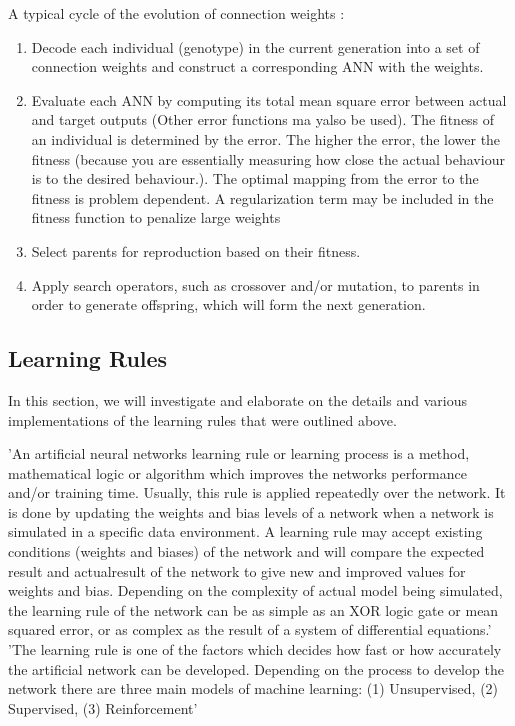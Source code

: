 A typical cycle of the evolution of connection weights \cite{XinYao1999}:
\begin{enumerate}
	\item Decode each individual (genotype) in the current generation into a set of connection weights and construct a corresponding ANN with the weights.
	\item Evaluate each ANN by computing its total mean square error between actual and target outputs (Other error functions ma yalso be used). The fitness of an individual is determined by the error. The higher the error, the lower the fitness (because you are essentially measuring how close the actual behaviour is to the desired behaviour.). The optimal mapping from the error to the fitness is problem dependent. A regularization term may be included in the fitness function to penalize large weights
	\item Select parents for reproduction based on their fitness.
	\item Apply search operators, such as crossover and/or mutation, to parents in order to generate offspring, which will form the next generation.
\end{enumerate}

\subsection{Learning Rules}

In this section, we will investigate and elaborate on the details and various implementations of the learning rules that were outlined above.

'An artificial neural networks learning rule or learning process is a method, mathematical logic or algorithm which improves the networks performance and/or training time. Usually, this rule is applied repeatedly over the network. It is done by updating the weights and bias levels of a network when a network is simulated in a specific data environment. A learning rule may accept existing conditions (weights and biases) of the network and will compare the expected result and actualresult of the network to give new and improved values for weights and bias. Depending on the complexity of actual model being simulated, the learning rule of the network can be as simple as an XOR logic gate or mean squared error, or as complex as the result of a system of differential equations.'
'The learning rule is one of the factors which decides how fast or how accurately the artificial network can be developed. Depending on the process to develop the network there are three main models of machine learning: (1) Unsupervised, (2) Supervised, (3) Reinforcement'

